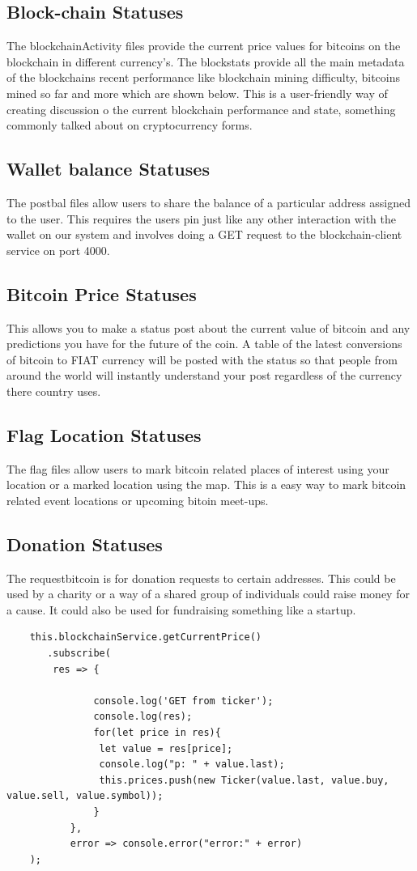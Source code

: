 \subsection{Block-chain Statuses}
The blockchainActivity files provide the current price values for bitcoins on the blockchain in different currency's. The blockstats provide all the main metadata of the blockchains recent performance like blockchain mining difficulty, bitcoins mined so far and more which are shown below. This is a user-friendly way of creating discussion o the current blockchain performance and state, something commonly talked about on cryptocurrency forms.

\subsection{Wallet balance Statuses}
 The postbal files allow users to share the balance of a particular address assigned to the user. This requires the users pin just like any other interaction with the wallet on our system and involves doing a GET request to the blockchain-client service on port 4000.

\subsection{Bitcoin Price Statuses}
This allows you to make a status post about the current value of bitcoin and any predictions you have for the future of the coin. A table of the latest conversions of bitcoin to FIAT currency will be posted with the status so that people from around the world will instantly understand your post regardless of the currency there country uses.

\subsection{Flag Location Statuses}
The flag files allow users to mark bitcoin related places of interest using your location or a marked location using the map. This is a easy way to mark bitcoin related event locations or upcoming bitoin meet-ups.

\subsection{Donation Statuses}
The requestbitcoin is for donation requests to certain addresses. This could be used by a charity or a way of a shared group of individuals could raise money for a cause. It could also be used for fundraising something like a startup.
\begin{lstlisting}
    this.blockchainService.getCurrentPrice()
       .subscribe(
        res => {

               console.log('GET from ticker');
               console.log(res);
               for(let price in res){
                let value = res[price];
                console.log("p: " + value.last); 
                this.prices.push(new Ticker(value.last, value.buy, value.sell, value.symbol));
               } 
           },
           error => console.error("error:" + error)
    );
  
\end{lstlisting}

